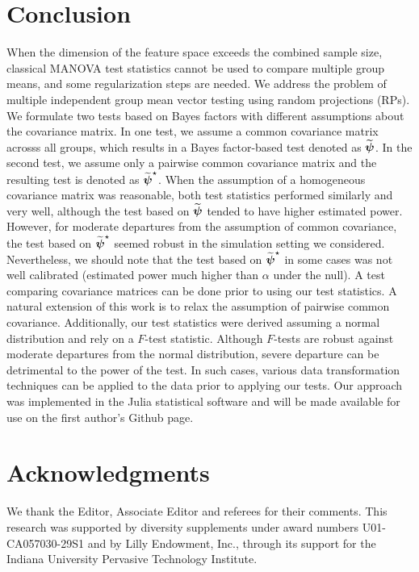 \documentclass[times,sort&compress,3p]{elsarticle}
\theoremstyle{plain}%
\theoremstyle{definition}
\def\boldpsi{{\mbox{\boldmath $\psi$}}}
\begin{document}
\section{Conclusion} \label{sec:conclusion}
When the dimension of the feature space exceeds the combined sample size, classical MANOVA test statistics cannot be used to compare multiple group means, and some regularization steps are needed. We address the problem of multiple independent group mean vector testing using random projections (RPs). We formulate two tests based on Bayes factors with different assumptions about the covariance matrix. In one test, we assume a common covariance matrix acrosss all groups, which results in a Bayes factor-based test denoted as $\widetilde{\boldpsi}$. In the second test, we assume only a pairwise common covariance matrix and the resulting test is denoted as $\widetilde{\boldpsi}^{\star}$. When the assumption of a homogeneous covariance matrix was reasonable, both test statistics performed similarly and very well, although the test based on $\widetilde{\boldpsi}$ tended to have higher estimated power. However, for moderate departures from the assumption of common covariance, the test based on $\widetilde{\boldpsi}^{\star}$ seemed robust in the simulation setting we considered. Nevertheless, we should note that the test based on $\widetilde{\boldpsi}^{\star}$ in some cases was not well calibrated (estimated power much higher than $\alpha$ under the null). A test comparing covariance matrices can be done prior to using our test statistics.  A natural extension of this work is to relax the assumption of pairwise common covariance. Additionally, our test statistics were derived assuming a normal distribution and rely on a $F$-test statistic. Although $F$-tests are robust against moderate departures from the normal distribution, severe departure can be detrimental to the power of the test. In such cases, various data transformation techniques can be applied to the data prior to applying our tests. Our approach was implemented in the  \textsf{Julia} \cite{bezanson2012julia} statistical software and will be made available for use on the first author's Github page.   

\section*{Acknowledgments}

We thank the Editor, Associate Editor and referees for their comments. This research was supported by diversity supplements under award numbers U01-CA057030-29S1 and by Lilly Endowment, Inc., through its support for the Indiana University Pervasive Technology Institute.
\end{document}

